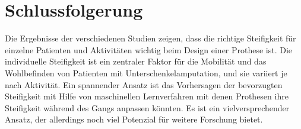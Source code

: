 \section{Schlussfolgerung}
Die Ergebnisse der verschiedenen Studien zeigen, dass die richtige Steifigkeit für einzelne Patienten und Aktivitäten wichtig beim Design einer Prothese ist. Die individuelle Steifigkeit ist ein zentraler Faktor für die Mobilität und das Wohlbefinden von Patienten mit Unterschenkelamputation, und sie variiert je nach Aktivität. Ein spannender Ansatz ist das Vorhersagen der bevorzugten Steifigkeit mit Hilfe von maschinellen Lernverfahren mit denen Prothesen ihre Steifigkeit während des Gangs anpassen könnten. Es ist ein vielversprechender Ansatz, der allerdings noch viel Potenzial für weitere Forschung bietet. 


